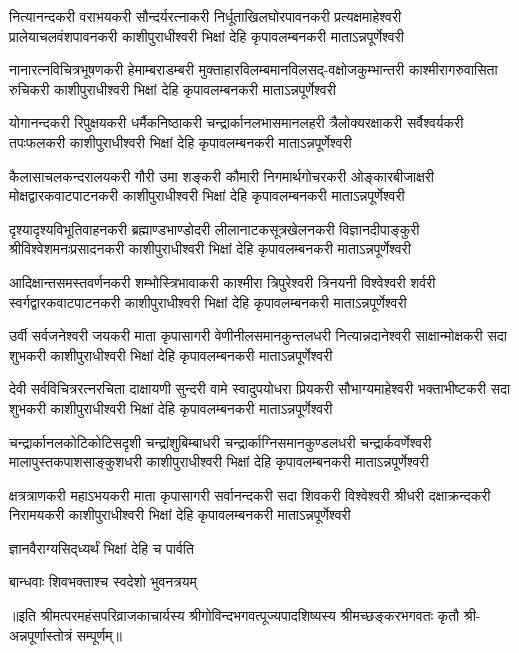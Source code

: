
\fourlineindentedshloka
{नित्यानन्दकरी वराभयकरी सौन्दर्यरत्नाकरी}
{निर्धूताखिलघोरपावनकरी प्रत्यक्षमाहेश्वरी}
{प्रालेयाचलवंशपावनकरी काशीपुराधीश्वरी}
{भिक्षां देहि कृपावलम्बनकरी माताऽन्नपूर्णेश्वरी}

\fourlineindentedshloka
{नानारत्नविचित्रभूषणकरी हेमाम्बराडम्बरी}
{मुक्ताहारविलम्बमानविलसद्-वक्षोजकुम्भान्तरी}
{काश्मीरागरुवासिता रुचिकरी काशीपुराधीश्वरी}
{भिक्षां देहि कृपावलम्बनकरी माताऽन्नपूर्णेश्वरी}

\fourlineindentedshloka
{योगानन्दकरी रिपुक्षयकरी धर्मैकनिष्ठाकरी}
{चन्द्रार्कानलभासमानलहरी त्रैलोक्यरक्षाकरी}
{सर्वैश्वर्यकरी तपःफलकरी काशीपुराधीश्वरी}
{भिक्षां देहि कृपावलम्बनकरी माताऽन्नपूर्णेश्वरी}

\fourlineindentedshloka
{कैलासाचलकन्दरालयकरी गौरी उमा शङ्करी}
{कौमारी निगमार्थगोचरकरी ओङ्कारबीजाक्षरी}
{मोक्षद्वारकवाटपाटनकरी काशीपुराधीश्वरी}
{भिक्षां देहि कृपावलम्बनकरी माताऽन्नपूर्णेश्वरी}

\fourlineindentedshloka
{दृश्यादृश्यविभूतिवाहनकरी ब्रह्माण्डभाण्डोदरी}
{लीलानाटकसूत्रखेलनकरी विज्ञानदीपाङ्कुरी}
{श्रीविश्वेशमनःप्रसादनकरी काशीपुराधीश्वरी}
{भिक्षां देहि कृपावलम्बनकरी माताऽन्नपूर्णेश्वरी}

\fourlineindentedshloka
{आदिक्षान्तसमस्तवर्णनकरी शम्भोस्त्रिभावाकरी}
{काश्मीरा त्रिपुरेश्वरी त्रिनयनी विश्वेश्वरी शर्वरी}
{स्वर्गद्वारकवाटपाटनकरी काशीपुराधीश्वरी}
{भिक्षां देहि कृपावलम्बनकरी माताऽन्नपूर्णेश्वरी}

\fourlineindentedshloka
{उर्वी सर्वजनेश्वरी जयकरी माता कृपासागरी}
{वेणीनीलसमानकुन्तलधरी नित्यान्नदानेश्वरी}
{साक्षान्मोक्षकरी सदा शुभकरी काशीपुराधीश्वरी}
{भिक्षां देहि कृपावलम्बनकरी माताऽन्नपूर्णेश्वरी}

\fourlineindentedshloka
{देवी सर्वविचित्ररत्नरचिता दाक्षायणी सुन्दरी}
{वामे स्वादुपयोधरा प्रियकरी सौभाग्यमाहेश्वरी}
{भक्ताभीष्टकरी सदा शुभकरी काशीपुराधीश्वरी}
{भिक्षां देहि कृपावलम्बनकरी माताऽन्नपूर्णेश्वरी}

\fourlineindentedshloka
{चन्द्रार्कानलकोटिकोटिसदृशी चन्द्रांशुबिम्बाधरी}
{चन्द्रार्काग्निसमानकुण्डलधरी चन्द्रार्कवर्णेश्वरी}
{मालापुस्तकपाशसाङ्कुशधरी काशीपुराधीश्वरी}
{भिक्षां देहि कृपावलम्बनकरी माताऽन्नपूर्णेश्वरी}

\fourlineindentedshloka
{क्षत्रत्राणकरी महाऽभयकरी माता कृपासागरी}
{सर्वानन्दकरी सदा शिवकरी विश्वेश्वरी श्रीधरी}
{दक्षाक्रन्दकरी निरामयकरी काशीपुराधीश्वरी}
{भिक्षां देहि कृपावलम्बनकरी माताऽन्नपूर्णेश्वरी}

{ज्ञानवैराग्यसिद्‌ध्यर्थं भिक्षां देहि च पार्वति}

{बान्धवाः शिवभक्ताश्च स्वदेशो भुवनत्रयम्}

॥इति  श्रीमत्परमहंसपरिव्राजकाचार्यस्य श्रीगोविन्दभगवत्पूज्यपादशिष्यस्य 
श्रीमच्छङ्करभगवतः कृतौ  श्री-अन्नपूर्णास्तोत्रं सम्पूर्णम्॥